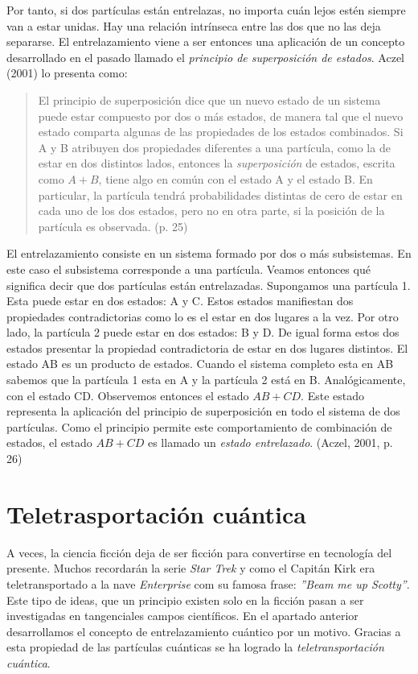 \documentclass[11pt,a4paper]{article}
\begin{document}
Por tanto, si dos partículas están entrelazas, no importa cuán lejos estén siempre van a estar unidas. Hay una relación intrínseca entre las dos que no las deja separarse. El entrelazamiento viene a ser entonces una aplicación de un concepto desarrollado en el pasado llamado el \textit{principio de superposición de estados}. Aczel (2001) lo presenta como:
\begin{quote}
El principio de superposición dice que un nuevo estado de un sistema puede estar compuesto por dos o más estados, de manera tal que el nuevo estado comparta algunas de las propiedades de los estados combinados. Si A y B atribuyen dos propiedades diferentes a una partícula, como la de estar en dos distintos lados, entonces la \textit{superposición} de estados, escrita como $A + B$, tiene algo en común con el estado A y el estado B. En particular, la partícula tendrá probabilidades distintas de cero de estar en cada uno de los dos estados, pero no en otra parte, si la posición de la partícula es observada. (p. 25)
\end{quote}
El entrelazamiento consiste en un sistema formado por dos o más subsistemas. En este caso el subsistema corresponde a una partícula. Veamos entonces qué significa decir que dos partículas están entrelazadas. Supongamos una partícula 1. Esta puede estar en dos estados: A y C. Estos estados manifiestan dos propiedades contradictorias como lo es el estar en dos lugares a la vez. Por otro lado, la partícula 2 puede estar en dos estados: B y D. De igual forma estos dos estados presentar la propiedad contradictoria de estar en dos lugares distintos. El estado AB es un producto de estados. Cuando el sistema completo esta en AB sabemos que la partícula 1 esta en A y la partícula 2 está en B. Analógicamente, con el estado CD. Observemos entonces el estado $AB + CD$. Este estado representa la aplicación del principio de superposición en todo el sistema de dos partículas. Como el principio permite este comportamiento de combinación de estados, el estado $AB + CD$ es llamado un \textit{estado entrelazado}. (Aczel, 2001, p. 26)

\section*{Teletrasportación cuántica}
A veces, la ciencia ficción deja de ser ficción para convertirse en tecnología del presente. Muchos recordarán la serie \textit{Star Trek} y como el Capitán Kirk era teletransportado a la nave \textit{Enterprise} com su famosa frase: \textit{''Beam me up Scotty''}. Este tipo de ideas, que un principio existen solo en la ficción pasan a ser investigadas en tangenciales campos científicos. En el apartado anterior desarrollamos el concepto de entrelazamiento cuántico por un motivo. Gracias a esta propiedad de las partículas cuánticas se ha logrado la \textit{teletransportación cuántica}. 
\end{document}
